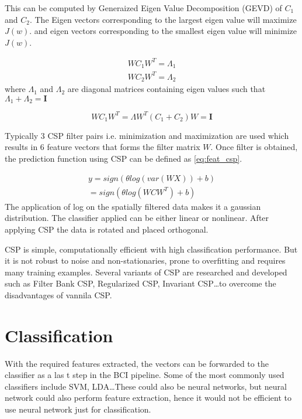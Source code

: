 This can be computed by Generaized Eigen Value Decomposition (GEVD) of $C_{1}$ and $C_{2}$. The Eigen vectors corresponding to the largest eigen value will maximize $J(w)$. and eigen vectors corresponding to the smallest eigen value will minimize $J(w)$. 

\begin{equation} \label{eq:def_csp}
    \begin{split}
        WC_{1}W^T = \Lambda_{1}\\
        WC_{2}W^T = \Lambda_{2}
    \end{split}
\end{equation}
where  $\Lambda_{1}$ and  $\Lambda_{2}$ are diagonal matrices containing eigen values such that $\Lambda_{1} + \Lambda_{2} = \mathbf{I}$

\begin{equation} \label{eq:def_gevd}
    WC_{1}W^T = \Lambda W^T(C_{1} + C_{2})W = \mathbf{I}
\end{equation}

Typically 3 CSP filter pairs i.e. minimization and maximization are used which results in 6 feature vectors that forms the filter matrix $W$. Once filter is obtained, the prediction function using CSP can be defined as \ref{eq:feat_csp}.

\begin{equation} \label{eq:feat_csp}
    \begin{split}
    y = sign(\theta log(var(WX)) +b) \\
        = sign(\theta log(WCW^T) + b)
    \end{split}
\end{equation}
The application of log on the spatially filtered data makes it a gaussian distribution. The classifier applied can be either linear or nonlinear. After applying CSP the data is rotated and placed orthogonal.

CSP is simple, computationally efficient with high classification performance. But it is not robust to noise and non-stationaries, prone to overfitting and requires many training examples. Several variants of CSP are researched and developed such as Filter Bank CSP, Regularized CSP, Invariant CSP\dots to overcome the disadvantages of vannila CSP.


\section{Classification}
With the required features extracted, the vectors can be forwarded to the classifier as a las t step in the BCI pipeline. Some of the most commonly used classifiers include SVM, LDA\dots These could also be neural networks, but neural network could also perform feature extraction, hence it would not be efficient to use neural network just for classification.

